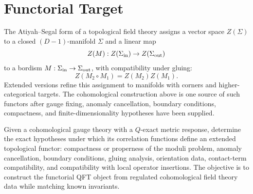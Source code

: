 \section{Functorial Target}

The Atiyah--Segal form of a topological field theory assigns a vector space
\(Z(\Sigma)\) to a closed \((D-1)\)-manifold \(\Sigma\) and a linear map
\[
  Z(M):Z(\Sigma_{\rm in})\to Z(\Sigma_{\rm out})
\]
to a bordism \(M:\Sigma_{\rm in}\to\Sigma_{\rm out}\), with compatibility
under gluing:
\[
  Z(M_2\circ M_1)=Z(M_2)Z(M_1).
\]
Extended versions refine this assignment to manifolds with corners and
higher-categorical targets.  The cohomological construction above is one
source of such functors after gauge fixing, anomaly cancellation, boundary
conditions, compactness, and finite-dimensionality hypotheses have been
supplied.

\begin{openproblem}
\label{op:cohomological-to-extended-functor}
Given a cohomological gauge theory with a \(Q\)-exact metric response,
determine the exact hypotheses under which its correlation functions define
an extended topological functor: compactness or properness of the moduli
problem, anomaly cancellation, boundary conditions, gluing analysis,
orientation data, contact-term compatibility, and compatibility with local
operator insertions.  The objective is to construct the functorial QFT object
from regulated cohomological field theory data while matching known invariants.
\end{openproblem}
